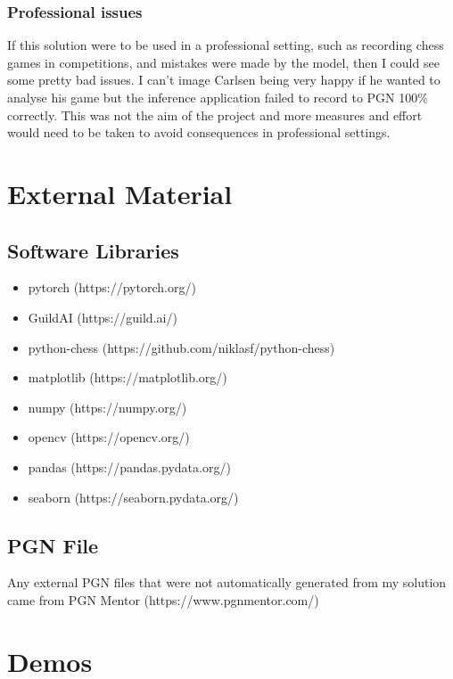 \begin{appendices}
\subsection{Professional issues}
If this solution were to be used in a professional setting, such as recording chess games in competitions, and mistakes were made by the model, then I could see some 
pretty bad issues.  I can't image Carlsen being very happy if he wanted to analyse his game but the inference application failed to record to PGN 100\% correctly. 
This was not the aim of the project and more measures and effort would need to be taken to avoid consequences in professional settings.

%
%
\chapter{External Material}

\section{Software Libraries}
\begin{itemize}
    \item pytorch (https://pytorch.org/)
    \item GuildAI (https://guild.ai/)
    \item python-chess (https://github.com/niklasf/python-chess)
    \item matplotlib (https://matplotlib.org/)
    \item numpy (https://numpy.org/)
    \item opencv (https://opencv.org/)
    \item pandas (https://pandas.pydata.org/)
    \item seaborn (https://seaborn.pydata.org/)
\end{itemize}

\section{PGN File}
Any external PGN files that were not automatically generated from my solution came from PGN Mentor (https://www.pgnmentor.com/)

%
%

\chapter{Demos}


\end{appendices}

